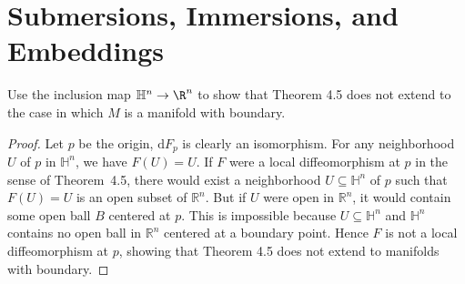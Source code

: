 \chapter{Submersions, Immersions, and Embeddings}

\begin{problem}
    Use the inclusion map $ \mathbb{H}^n \to \R^n$ to show that Theorem 4.5 does not extend to the case in which $M$ is a manifold with boundary.
    \begin{proof}
        Let \(p\) be the origin, \(\mathrm{d}F_p\) is clearly an isomorphism.  
        For any neighborhood \(U\) of \(p\) in \(\mathbb{H}^n\), we have \(F(U) = U\).  
        If \(F\) were a local diffeomorphism at \(p\) in the sense of Theorem~4.5, there would exist a neighborhood \(U \subseteq \mathbb{H}^n\) of \(p\) such that \(F(U)=U\) is an open subset of \(\mathbb{R}^n\).  
        But if \(U\) were open in \(\mathbb{R}^n\), it would contain some open ball \(B\) centered at \(p\).  
        This is impossible because \(U \subseteq \mathbb{H}^n\) and \(\mathbb{H}^n\) contains no open ball in \(\mathbb{R}^n\) centered at a boundary point.  
        Hence \(F\) is not a local diffeomorphism at \(p\), showing that Theorem 4.5 does not extend to manifolds with boundary.
    \end{proof}
\end{problem}


